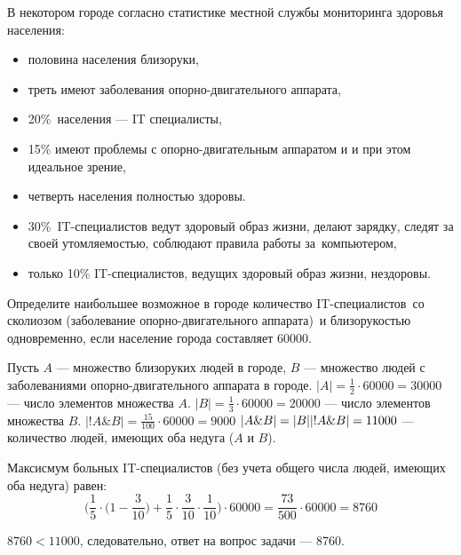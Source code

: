 
В некотором городе согласно статистике местной службы мониторинга здоровья населения:
\begin{itemize}
\item половина населения близоруки,
\item треть имеют заболевания опорно-двигательного аппарата,
\item 20\% населения — IT специалисты,
\item 15\% имеют проблемы с опорно-двигательным аппаратом и и при этом идеальное зрение, 
\item четверть населения полностью здоровы.
\item 30\% IT-специалистов ведут здоровый образ жизни, делают зарядку, следят за своей утомляемостью, соблюдают правила работы за компьютером,
\item только 10\% IT-специалистов, ведущих здоровый образ жизни, нездоровы.
\end{itemize}

Определите наибольшее возможное в городе количество IT-специалистов со сколиозом (заболевание опорно-двигательного аппарата) и близорукостью одновременно, если население города составляет 60000.

\solutionSection

Пусть $A$ — множество близоруких людей в городе, $B$ — множество людей с заболеваниями опорно-двигательного аппарата в городе.
$|A| = \frac{1}{2} \cdot 60000 = 30000$ — число элементов множества $A$.  
$|B| = \frac{1}{3} \cdot 60000 = 20000$ — число элементов множества $B$.
$|!A \& B| = \frac{15}{100} \cdot 60000 = 9000$ 
$|A \& B| = |B| \\ |!A \& B| = 11000$ — количество людей, имеющих оба недуга ($A$ и $B$).

Максисмум больных IT-специалистов (без учета общего числа людей, имеющих оба недуга) равен: 
$$\big(\frac{1}{5} \cdot \big(1 - \frac{3}{10}\big) + \frac{1}{5} \cdot \frac{3}{10} \cdot \frac{1}{10}\big) \cdot 60000 = \frac{73}{500} \cdot 60000 = 8760$$


$8760 < 11000$, следовательно, ответ на вопрос задачи — 8760.

